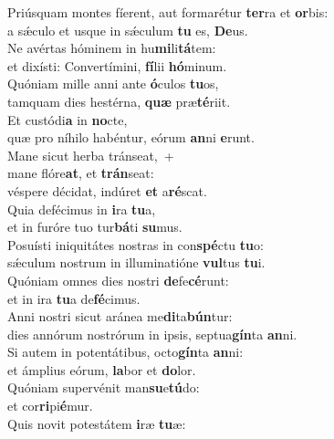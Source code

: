 \evenverse Priúsquam montes fíerent, aut formarétur \textbf{ter}ra et \textbf{or}bis:~\*\\
\evenverse a sǽculo et usque in sǽculum \textbf{tu} es, \textbf{De}us.\\
\oddverse Ne avértas hóminem in hu\textbf{mi}li\textbf{tá}tem:~\*\\
\oddverse et dixísti: Convertímini, \textbf{fí}lii \textbf{hó}minum.\\
\evenverse Quóniam mille anni ante \textbf{ó}culos \textbf{tu}os,~\*\\
\evenverse tamquam dies hestérna, \textbf{quæ} præ\textbf{té}riit.\\
\oddverse Et custódi\textbf{a} in \textbf{no}cte,~\*\\
\oddverse quæ pro níhilo habéntur, eórum \textbf{an}ni \textbf{e}runt.\\
\evenverse Mane sicut herba tránseat,~+\\
\evenverse  mane flóre\textbf{at}, et \textbf{trán}seat:~\*\\
\evenverse véspere décidat, indúret \textbf{et} a\textbf{ré}scat.\\
\oddverse Quia defécimus in \textbf{i}ra \textbf{tu}a,~\*\\
\oddverse et in furóre tuo tur\textbf{bá}ti \textbf{su}mus.\\
\evenverse Posuísti iniquitátes nostras in con\textbf{spé}ctu \textbf{tu}o:~\*\\
\evenverse sǽculum nostrum in illuminatióne \textbf{vul}tus \textbf{tu}i.\\
\oddverse Quóniam omnes dies nostri \textbf{de}fe\textbf{cé}runt:~\*\\
\oddverse et in ira \textbf{tu}a de\textbf{fé}cimus.\\
\evenverse Anni nostri sicut aránea me\textbf{di}ta\textbf{bún}tur:~\*\\
\evenverse dies annórum nostrórum in ipsis, septua\textbf{gín}ta \textbf{an}ni.\\
\oddverse Si autem in potentátibus, octo\textbf{gín}ta \textbf{an}ni:~\*\\
\oddverse et ámplius eórum, \textbf{la}bor et \textbf{do}lor.\\
\evenverse Quóniam supervénit man\textbf{su}e\textbf{tú}do:~\*\\
\evenverse et cor\textbf{ri}pi\textbf{é}mur.\\
\oddverse Quis novit potestátem \textbf{i}ræ \textbf{tu}æ:~\*\\
